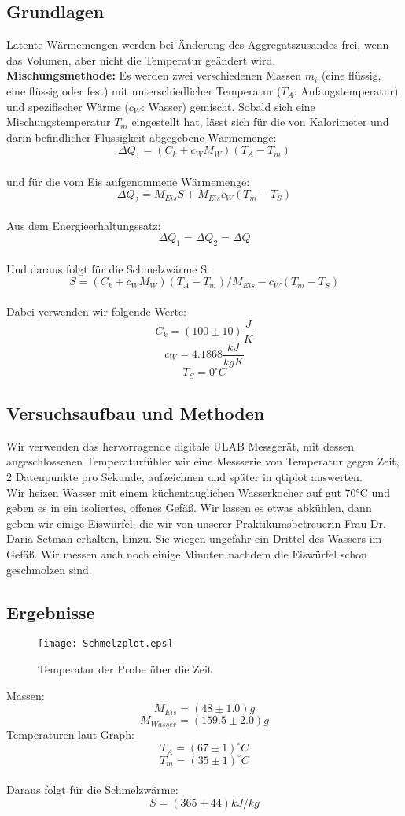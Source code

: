 \documentclass{article}
\begin{document}
\subsection{Grundlagen}
Latente Wärmemengen werden bei Änderung des Aggregatszusandes frei, wenn das Volumen, aber nicht die Temperatur geändert wird. \\
\textbf{Mischungsmethode:}
Es werden zwei verschiedenen Massen $m_i$ (eine flüssig, eine flüssig oder fest) mit unterschiedlicher Temperatur ($T_A$: Anfangstemperatur) und spezifischer Wärme ($c_W$: Wasser) gemischt. Sobald sich eine Mischungstemperatur $T_m$ eingestellt hat, lässt sich für die von Kalorimeter und darin befindlicher Flüssigkeit abgegebene Wärmemenge:
$$\Delta Q_1=(C_k + c_W M_W)(T_A - T_m)$$
\\
und für die vom Eis aufgenommene Wärmemenge:
$$\Delta Q_2=M_{Eis} S + M_{Eis} c_W (T_m - T_S)$$
\\
Aus dem Energieerhaltungssatz:
$$\Delta Q_1=\Delta Q_2=\Delta Q$$
\\
Und daraus folgt für die Schmelzwärme S:
$$S=(C_k+c_W M_W)(T_A-T_m) / M_{Eis} - c_W(T_m-T_S)$$
\\
Dabei verwenden wir folgende Werte: 
$$C_k=(100 \pm 10)\frac{J}{K}$$
$$c_W=4.1868 \frac{kJ}{kg K}$$
$$T_S=0 ^\circ C$$
\subsection{Versuchsaufbau und Methoden}
Wir verwenden das hervorragende digitale ULAB Messgerät, mit dessen angeschlossenen Temperaturfühler wir eine Messserie von Temperatur gegen Zeit, 2 Datenpunkte pro Sekunde, aufzeichnen und später in qtiplot auswerten. \\
Wir heizen Wasser mit einem küchentauglichen Wasserkocher auf gut 70°C und geben es in ein isoliertes, offenes Gefäß. Wir lassen es etwas abkühlen, dann geben wir einige Eiswürfel, die wir von unserer Praktikumsbetreuerin Frau Dr. Daria Setman erhalten, hinzu. Sie wiegen ungefähr ein Drittel des Wassers im Gefäß. Wir messen auch noch einige Minuten nachdem die Eiswürfel schon geschmolzen sind.
\subsection{Ergebnisse}
\begin{center}
\begin{figure}
\caption{Temperatur der Probe über die Zeit}
\texttt{[image: Schmelzplot.eps]}
\end{figure}
\end{center}
Massen:
$$M_{Eis}= (48 \pm 1.0)g$$
$$M_{Wasser} = (159.5 \pm 2.0)g$$
Temperaturen laut Graph:
$$T_A=(67 \pm 1) ^\circ C$$
$$T_m=(35 \pm 1) ^\circ C$$
\\
Daraus folgt für die Schmelzwärme:
$$\boxed{S=(365 \pm 44) kJ/kg}$$
\end{document}
